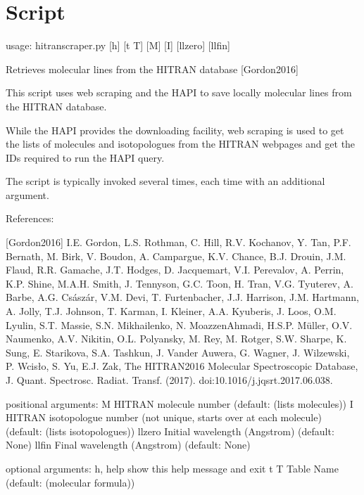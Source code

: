 \documentclass[letterpaper,10pt,english]{sphinxmanual}
\begin{document}
\section{Script }
\label{\detokenize{autoscripts/script-hitran-scraper:script-hitran-scraper-py}}\label{\detokenize{autoscripts/script-hitran-scraper::doc}}
\begin{sphinxVerbatim}[commandchars=\\\{\}]
usage: hitran\PYGZhy{}scraper.py [\PYGZhy{}h] [\PYGZhy{}t T] [M] [I] [llzero] [llfin]

Retrieves molecular lines from the HITRAN database [Gordon2016]

This script uses web scraping and the HAPI to save locally molecular lines from the HITRAN database.

While the HAPI provides the downloading facility, web scraping is used to get the lists of molecules
and isotopologues from the HITRAN webpages and get the IDs required to run the HAPI query.

The script is typically invoked several times, each time with an additional argument.

References:

[Gordon2016] I.E. Gordon, L.S. Rothman, C. Hill, R.V. Kochanov, Y. Tan, P.F. Bernath, M. Birk,
    V. Boudon, A. Campargue, K.V. Chance, B.J. Drouin, J.\PYGZhy{}M. Flaud, R.R. Gamache, J.T. Hodges,
    D. Jacquemart, V.I. Perevalov, A. Perrin, K.P. Shine, M.\PYGZhy{}A.H. Smith, J. Tennyson, G.C. Toon,
    H. Tran, V.G. Tyuterev, A. Barbe, A.G. Császár, V.M. Devi, T. Furtenbacher, J.J. Harrison,
    J.\PYGZhy{}M. Hartmann, A. Jolly, T.J. Johnson, T. Karman, I. Kleiner, A.A. Kyuberis, J. Loos,
    O.M. Lyulin, S.T. Massie, S.N. Mikhailenko, N. Moazzen\PYGZhy{}Ahmadi, H.S.P. Müller, O.V. Naumenko,
    A.V. Nikitin, O.L. Polyansky, M. Rey, M. Rotger, S.W. Sharpe, K. Sung, E. Starikova,
    S.A. Tashkun, J. Vander Auwera, G. Wagner, J. Wilzewski, P. Wcisło, S. Yu, E.J. Zak,
    The HITRAN2016 Molecular Spectroscopic Database, J. Quant. Spectrosc. Radiat. Transf. (2017).
    doi:10.1016/j.jqsrt.2017.06.038.

positional arguments:
  M           HITRAN molecule number (default: (lists molecules))
  I           HITRAN isotopologue number (not unique, starts over at each
              molecule) (default: (lists isotopologues))
  llzero      Initial wavelength (Angstrom) (default: None)
  llfin       Final wavelength (Angstrom) (default: None)

optional arguments:
  \PYGZhy{}h, \PYGZhy{}\PYGZhy{}help  show this help message and exit
  \PYGZhy{}t T        Table Name (default: (molecular formula))
\end{sphinxVerbatim}
\end{document}
